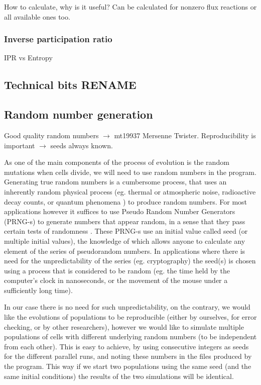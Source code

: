 \documentclass[10pt,a4paper]{article}
\begin{document}
How to calculate, why is it useful? Can be calculated for nonzero flux reactions or all available ones too. 

\subsubsection{Inverse participation ratio}
\label{ssub:Inverse participation ratio}
IPR vs Entropy

\subsection{Technical bits RENAME}
\label{sub:technical_bits_rename}

\subsection{Random number generation}
\label{sub:Random number generation}

Good quality random numbers $\rightarrow$ mt19937 Mersenne Twister. Reproducibility is important $\rightarrow$ seeds always known. 

As one of the main components of the process of evolution is the random mutations when cells divide, we will need to use random numbers in the program. Generating true random numbers is a cumbersome process, that uses an inherently random physical process (eg. thermal or atmospheric noise, radioactive decay counts, or quantum phenomena \cite{truerandom}) to produce random numbers. For most applications however it suffices to use Pseudo Random Number Generators (PRNG-s) to generate numbers that appear random, in a sense that they pass certain tests of randomness \cite[]{randomtests}. These PRNG-s use an initial value called seed (or multiple initial values), the knowledge of which allows anyone to calculate any element of the series of pseudorandom numbers. In applications where there is need for the unpredictability of the series (eg. cryptography) the seed(s) is chosen using a process that is considered to be random (eg. the time held by the computer's clock in nanoseconds, or the movement of the mouse under a sufficiently long time).

In our case there is no need for such unpredictability, on the contrary, we would like the evolutions of populations to be reproducible (either by ourselves, for error checking, or by other researchers), however we would like to simulate multiple populations of cells with different underlying random numbers (to be independent from each other). This is easy to achieve, by using consecutive integers as seeds for the different parallel runs, and noting these numbers in the files produced by the program. This way if we start two populations using the same seed (and the same initial conditions) the results of the two simulations will be identical. 
\end{document}
